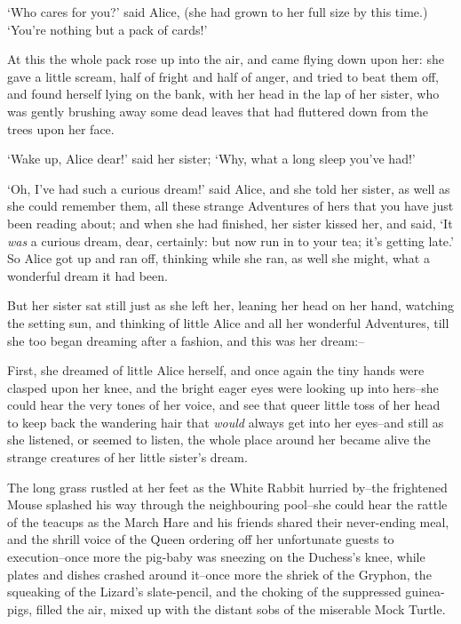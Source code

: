  `Who cares for you?' said Alice, (she had grown to her full
size by this time.)  `You're nothing but a pack of cards!'

  At this the whole pack rose up into the air, and came flying
down upon her:  she gave a little scream, half of fright and half
of anger, and tried to beat them off, and found herself lying on
the bank, with her head in the lap of her sister, who was gently
brushing away some dead leaves that had fluttered down from the
trees upon her face.

  `Wake up, Alice dear!' said her sister; `Why, what a long
sleep you've had!'

  `Oh, I've had such a curious dream!' said Alice, and she told
her sister, as well as she could remember them, all these strange
Adventures of hers that you have just been reading about; and
when she had finished, her sister kissed her, and said, `It {\it was} a
curious dream, dear, certainly:  but now run in to your tea; it's
getting late.'  So Alice got up and ran off, thinking while she
ran, as well she might, what a wonderful dream it had been.

  But her sister sat still just as she left her, leaning her
head on her hand, watching the setting sun, and thinking of
little Alice and all her wonderful Adventures, till she too began
dreaming after a fashion, and this was her dream:--

  First, she dreamed of little Alice herself, and once again the
tiny hands were clasped upon her knee, and the bright eager eyes
were looking up into hers--she could hear the very tones of her
voice, and see that queer little toss of her head to keep back
the wandering hair that {\it would} always get into her eyes--and
still as she listened, or seemed to listen, the whole place
around her became alive the strange creatures of her little
sister's dream.

  The long grass rustled at her feet as the White Rabbit hurried
by--the frightened Mouse splashed his way through the
neighbouring pool--she could hear the rattle of the teacups as
the March Hare and his friends shared their never-ending meal,
and the shrill voice of the Queen ordering off her unfortunate
guests to execution--once more the pig-baby was sneezing on the
Duchess's knee, while plates and dishes crashed around it--once
more the shriek of the Gryphon, the squeaking of the Lizard's
slate-pencil, and the choking of the suppressed guinea-pigs,
filled the air, mixed up with the distant sobs of the miserable
Mock Turtle.

